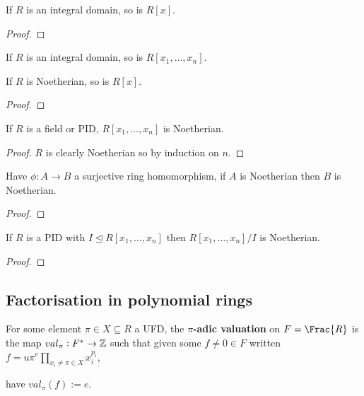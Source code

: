 \documentclass{report}
\begin{document}
\begin{proposition}
    If $R$ is an integral domain, so is $R[x]$.\begin{proof}
        
    \end{proof}
\end{proposition}

\begin{corollary}
    If $R$ is an integral domain, so is $R[x_1,\ldots,x_n]$.
\end{corollary}

\begin{theorem}
    If $R$ is Noetherian, so is $R[x]$. \begin{proof}
        
    \end{proof}
\end{theorem}

\begin{corollary}
    If $R$ is a field or PID, $R[x_1,\ldots,x_n]$ is Noetherian. \begin{proof}
        $R$ is clearly Noetherian so by induction on $n$.
    \end{proof}
\end{corollary}

\begin{lemma}
    Have $\phi:A\rightarrow B$ a surjective ring homomorphism, if $A$ is Noetherian then $B$ is Noetherian.\begin{proof}
        
    \end{proof}
\end{lemma}

\begin{corollary}
    If $R$ is a PID with $I\unlhd R[x_1,\ldots,x_n]$ then $R[x_1,\ldots,x_n]/I$ is Noetherian. \begin{proof}
        
    \end{proof}
\end{corollary}

\subsection{Factorisation in polynomial rings}

\begin{definition}
    For some element $\pi\in X\subseteq R$ a UFD, the \textbf{$\pi$-adic valuation} on $F=\Frac{R}$ is the map $val_\pi:F^*\rightarrow\mathbb{Z}$ such that given some $f\neq0\in F$ written $\displaystyle f=u\pi^e\prod_{x_i\neq\pi\in X}x_i^{p_i}$, 

    \vspace{-10pt}
    have $val_\pi(f):=e$.
\end{definition}
\end{document}

